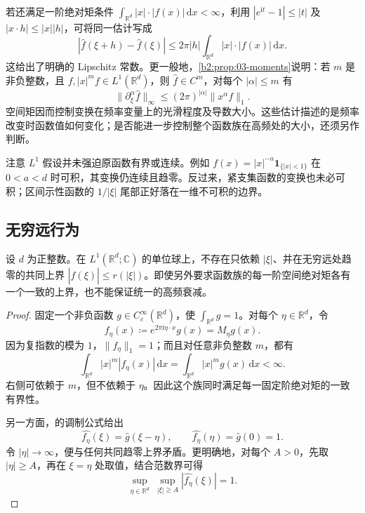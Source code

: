 若还满足一阶绝对矩条件 \(\int_{\mathbb R^d}|x|\cdot|f(x)|\,\mathrm{d}x<\infty\)，利用 \(|e^{\mathrm i t}-1|\leq|t|\) 及 \(|x\cdot h|\leq|x||h|\)，可将同一估计写成
\[
 |\widehat f(\xi+h)-\widehat f(\xi)|
 \leq 2\pi|h|\int_{\mathbb R^d}|x|\cdot|f(x)|\,\mathrm{d}x.
\]
这给出了明确的 Lipschitz 常数。更一般地，\cref{b2:prop:03-moments}说明：若 \(m\) 是非负整数，且 \(f,|x|^m f\in L^1(\mathbb R^d)\)，则 \(\widehat f\in C^m\)，对每个 \(|\alpha|\leq m\) 有
\[
 \|\partial_\xi^\alpha\widehat f\|_\infty
 \leq(2\pi)^{|\alpha|}\|x^\alpha f\|_1.
\]
空间矩因而控制变换在频率变量上的光滑程度及导数大小。这些估计描述的是频率改变时函数值如何变化；是否能进一步控制整个函数族在高频处的大小，还须另作判断。

\ProseParagraphBreak

注意 \(L^1\) 假设并未强迫原函数有界或连续。例如 \(f(x)=|x|^{-a}\mathbf1_{\{|x|<1\}}\) 在 \(0<a<d\) 时可积，其变换仍连续且趋零。反过来，紧支集函数的变换也未必可积；区间示性函数的 \(1/|\xi|\) 尾部正好落在一维不可积的边界。

\subsection{无穷远行为}
\label{b2:subsec:030203}

\begin{proposition}\label{b2:prop:03-no-uniform-decay}
设 \(d\) 为正整数。在 \(L^1(\mathbb R^d;\mathbb C)\) 的单位球上，不存在只依赖 \(|\xi|\)、并在无穷远处趋零的共同上界 \(|\widehat f(\xi)|\leq r(|\xi|)\)。即使另外要求函数族的每一阶空间绝对矩各有一个一致的上界，也不能保证统一的高频衰减。
\end{proposition}
\begin{proof}
固定一个非负函数 \(g\in C_c^\infty(\mathbb R^d)\)，使 \(\int_{\mathbb R^d}g=1\)。对每个 \(\eta\in\mathbb R^d\)，令
\[
 f_\eta(x)\coloneqq e^{2\pi\mathrm i\eta\cdot x}g(x)=M_\eta g(x).
\]
因为复指数的模为 \(1\)，\(\|f_\eta\|_1=1\)；而且对任意非负整数 \(m\)，都有
\[
 \int_{\mathbb R^d}|x|^m|f_\eta(x)|\,\mathrm dx
 =\int_{\mathbb R^d}|x|^m g(x)\,\mathrm dx<\infty.
\]
右侧可依赖于 \(m\)，但不依赖于 \(\eta\)。因此这个族同时满足每一固定阶绝对矩的一致有界性。

另一方面，的调制公式给出
\[
 \widehat{f_\eta}(\xi)=\widehat g(\xi-\eta),
 \qquad \widehat{f_\eta}(\eta)=\widehat g(0)=1.
\]
令 \(|\eta|\to\infty\)，便与任何共同趋零上界矛盾。更明确地，对每个 \(A>0\)，先取 \(|\eta|\geq A\)，再在 \(\xi=\eta\) 处取值，结合范数界可得
\[
 \sup_{\eta\in\mathbb R^d}\ \sup_{|\xi|\geq A}|\widehat{f_\eta}(\xi)|=1.
\]
\end{proof}

